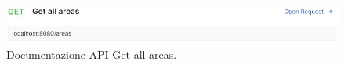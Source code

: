 \begin{figure}[h!]
	\centering
	\includegraphics[width=1\linewidth]{./Iterazione 2/ImageFiles/GetAllAreas}
	
	\caption{Documentazione API Get all areas.}
	\label{fig:GetAllAreasAPI}
\end{figure}

\clearpage


